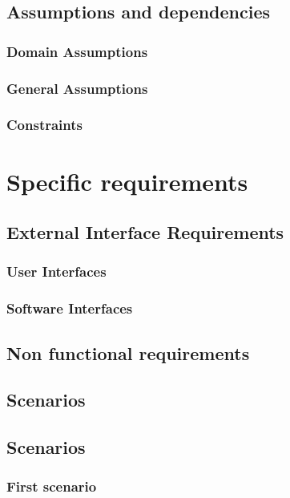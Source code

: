 \documentclass[12pt]{article}
\begin{document}
	\subsection{Assumptions and dependencies}
	\subsubsection{Domain Assumptions}
	
	
	\subsubsection{General Assumptions}
	
	\subsubsection{Constraints}
	
	
	\clearpage
	\section{Specific requirements}
	\subsection{External Interface Requirements}
	\subsubsection{User Interfaces}
	\clearpage
	\subsubsection{Software Interfaces}
	
	\subsection{Non functional requirements}	
	\subsection{Scenarios}
	\subsection{Scenarios}
	\subsubsection{First scenario}
	
\end{document}
